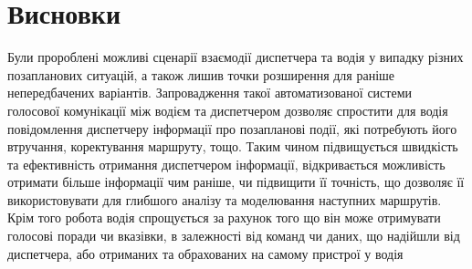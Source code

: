 \section{Висновки}
Були пророблені можливі сценарії взаємодії диспетчера та водія у випадку різних позапланових ситуацій, а також лишив точки розширення для раніше непередбачених варіантів. Запровадження такої автоматизованої системи голосової комунікації між водієм та диспетчером дозволяє спростити для водія повідомлення диспетчеру інформації про позапланові події, які потребують його втручання, коректування маршруту, тощо. Таким чином підвищується швидкість та ефективність отримання диспетчером інформації, відкривається можливість отримати більше інформації чим раніше, чи підвищити її точність, що дозволяє її використовувати для глибшого аналізу та моделювання наступних маршрутів. Крім того робота водія спрощується за рахунок того що він може отримувати голосові поради чи вказівки, в залежності від команд чи даних, що надійшли від диспетчера, або отриманих та обрахованих на самому пристрої у водія
